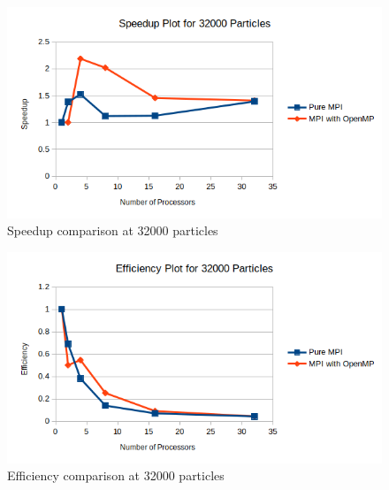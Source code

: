 \documentclass{article}
\begin{document}
\begin{figure}[H]
	\begin{center}
		\hspace*{-0.5cm}                                                           
  		\includegraphics[scale=0.7]{Report_Assets/speedup32000.png}
  	\end{center}
  	\caption{Speedup comparison at 32000 particles}
\end{figure}

\begin{figure}[H]
	\begin{center}
		\hspace*{-0.5cm}                                                           
  		\includegraphics[scale=0.7]{Report_Assets/efficiency32000.png}
  	\end{center}
  	\caption{Efficiency comparison at 32000 particles}
\end{figure}
\end{document}
